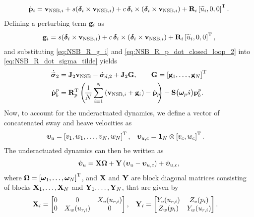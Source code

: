 \begin{equation}
    \dot{\mathbf{p}}_i = \mathbf{v}_{{\rm NSB}, i} 
                + s(\bm{\delta}_i \times \mathbf{v}_{{\rm NSB}, i})
                + c\,\bm{\delta}_i\times(\bm{\delta}_i \times \mathbf{v}_{{\rm NSB}, i})
                + \mathbf{R}_{i}\left[\widetilde{u}_i, 0, 0\right]^{\mathrm{T}}.
    \label{eq:NSB_R_p_dot_closed_loop_2}
\end{equation}
Defining a perturbing term $\mathbf{g}_i$ as 
\begin{equation}
    \mathbf{g}_i = s(\bm{\delta}_i \times \mathbf{v}_{{\rm NSB}, i}) 
                + c\,\bm{\delta}_i\times(\bm{\delta}_i \times \mathbf{v}_{{\rm NSB}, i}) 
                + \mathbf{R}_{i}\left[\widetilde{u}_i, 0, 0\right]^{\mathrm{T}},
                \label{eq:NSB_R_g_i}
\end{equation}
and substituting \eqref{eq:NSB_R_g_i} and \eqref{eq:NSB_R_p_dot_closed_loop_2} into \eqref{eq:NSB_R_dot_sigma_tilde} yields 
\begin{subequations}
    \begin{align}
        \dot{\widetilde{\bs{\sigma}}}_2 &= \mat{J}_2\ivel_{\rm NSB} - \dot{\bs{\sigma}}_{d, 2}
                                        +\mat{J}_2\mat{G}, \qquad \mat{G} = \inlinevector{\mat{g}_1, \ldots, \mat{g}_N} \\
        \dot{\mat{p}}_b^p &= \mat{R}_p\T\left(\!\frac{1}{N}\sum_{i=1}^N\left(\ivel_{{\rm NSB}, i} + \mat{g}_i\right) - \dot{\mat{p}}_{\mathrlap{p}}\right) - \mat{S}\big(\bs{\omega}_p\dot{s}\big)\mat{p}_b^p \mathrlap{.}
    \end{align} \label{eq:NSB_R_outer_loop}
\end{subequations}
Now, to account for the underactuated dynamics, we define a vector of concatenated sway and heave velocities as 
\begin{align}
    \bm{\upsilon}_u &= \left[v_1, w_1, \ldots, v_N, w_N\right]^{\mathrm{T}}, &
    \bm{\upsilon}_{u, c} &= \mathbf{1}_N \otimes \left[v_c, w_c\right]^{\mathrm{T}}.
\end{align}
The underactuated dynamics can then be written as
\begin{equation}
    \dot{\bm{\upsilon}}_u = \mathbf{X}\bm{\Omega} + \mathbf{Y}\left(\bm{\upsilon}_u - \bm{\upsilon}_{u, c}\right) + \dot{\bm{\upsilon}}_{u, c}, \label{eq:NSB_R_underactuated_dynamics_closed_loop}
\end{equation}
where $\bm{\Omega} = \left[\bm{\omega}_1, \ldots, \bm{\omega}_N\right]^{\mathrm{T}}$, and $\mathbf{X}$ and $\mathbf{Y}$ are block diagonal matrices consisting of blocks $\mathbf{X}_1, \ldots, \mathbf{X}_N$ and $\mathbf{Y}_1, \ldots, \mathbf{Y}_N$, that are given by 
\begin{align}
    \mathbf{X}_i &= 
    \begin{bmatrix}
        0 & 0 & X_v(u_{r, i}) \\
        0 & X_w(u_{r, i}) & 0
    \end{bmatrix}, &
    \mathbf{Y}_i &=
    \begin{bmatrix}
        Y_v(u_{r,i}) & Z_v(p_i) \\
        Z_w(p_i) & Y_w(u_{r, i})
    \end{bmatrix}.
\end{align}


